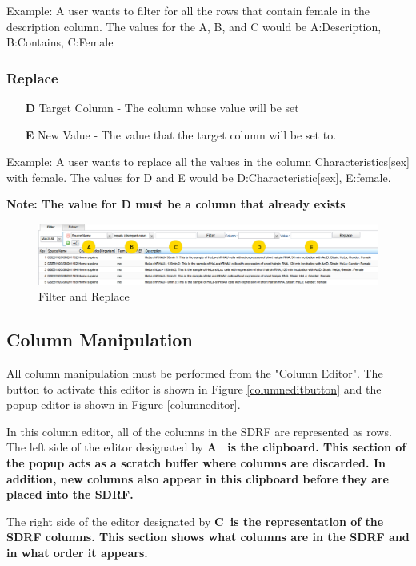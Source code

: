 \documentclass[a4paper]{article}
\begin{document}
Example: A user wants to filter for all the rows that contain female in the description column. The values for the A, B, and C would be A:Description, B:Contains, C:Female

\subsubsection{Replace}

\begin{enumerate}
\item[\bf{D}] Target Column - The column whose value will be set
\item[\bf{E}] New Value - The value that the target column will be set to.
\end{enumerate}

Example: A user wants to replace all the values in the column Characteristics[sex] with female. The values for D and E would be D:Characteristic[sex], E:female.

\bf{Note: The value for D must be a column that already exists}\rm

\begin{figure}[h]
\caption{Filter and Replace}
\centering
\label{filterandreplace}
\includegraphics[width=17cm]{images/Filter}
\end{figure}
\subsection{Column Manipulation}
All column manipulation must be performed from the "Column Editor". The button to activate this editor is shown in Figure \ref{columneditbutton} and the popup editor is shown in Figure \ref{columneditor}. 

In this column editor, all of the columns in the SDRF are represented as rows. The left side of the editor designated by \bf{A}\rm~ is the clipboard. This section of the popup acts as a scratch buffer where columns are discarded. In addition, new columns also appear in this clipboard before they are placed into the SDRF.

The right side of the editor designated by \bf{C}\rm ~is the representation of the SDRF columns. This section shows what columns are in the SDRF and in what order it appears.
\end{document}
